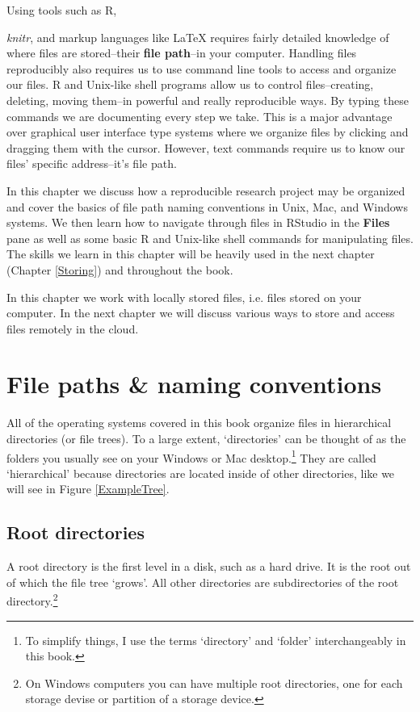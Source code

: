 Using tools such as R, {\emph{knitr}, and markup languages like LaTeX requires fairly detailed knowledge of where files are stored--their {\bf{file path}}--in your computer. Handling files reproducibly also requires us to use command line tools to access and organize our files. R and Unix-like shell programs allow us to control files--creating, deleting, moving them--in powerful and really reproducible ways. By typing these commands we are documenting every step we take. This is a major advantage over graphical user interface type systems where we organize files by clicking and dragging them with the cursor. However, text commands require us to know our files' specific address--it's file path. 

In this chapter we discuss how a reproducible research project may be organized and cover the basics of file path naming conventions in Unix, Mac, and Windows systems. We then learn how to navigate through files in RStudio in the {\bf{Files}} pane as well as some basic R and Unix-like shell commands for manipulating files. The skills we learn in this chapter will be heavily used in the next chapter (Chapter \ref{Storing}) and throughout the book.

In this chapter we work with locally stored files, i.e. files stored on your computer. In the next chapter we will discuss various ways to store and access files remotely in the cloud.


\section{File paths \& naming conventions}

All of the operating systems covered in this book organize files in hierarchical directories (or file trees). To a large extent, `directories' can be thought of as the folders you usually see on your Windows or Mac desktop.\footnote{To simplify things, I use the terms `directory' and `folder' interchangeably in this book.} They are called `hierarchical' because directories are located inside of other directories, like we will see in Figure \ref{ExampleTree}. 

\subsection{Root directories}

A root directory is the first level in a disk, such as a hard drive. It is the root out of which the file tree `grows'. All other directories are subdirectories of the root directory.\footnote{On Windows computers you can have multiple root directories, one for each storage devise or partition of a storage device.}


}
